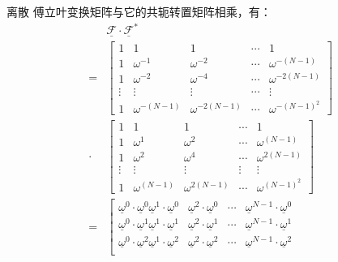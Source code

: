 离散 傅立叶变换矩阵与它的共轭转置矩阵相乘，有：
\begin{align*}
	      & \underline{\mathcal{F}}\cdot \underline{\mathcal{F}}^{*} \\
	=     &
	\left[
		\begin{matrix}
			1      & 1               & 1                & \cdots & 1                 \\
			1      & \omega^{-1}     & \omega^{-2}      & \cdots & \omega^{-(N-1)}   \\
			1      & \omega^{-2}     & \omega^{-4}      & \cdots & \omega^{-2(N-1)}  \\
			\vdots & \vdots          & \vdots           & \cdots & \vdots            \\
			1      & \omega^{-(N-1)} & \omega^{-2(N-1)} & \cdots & \omega^{-(N-1)^2}
		\end{matrix}
		\right]                                                          \\
	\cdot &
	\left[
		\begin{matrix}
			1      & 1              & 1               & \cdots & 1                \\
			1      & \omega^{1}     & \omega^{2}      & \cdots & \omega^{(N-1)}   \\
			1      & \omega^{2}     & \omega^{4}      & \cdots & \omega^{2(N-1)}  \\
			\vdots & \vdots         & \vdots          & \vdots & \vdots           \\
			1      & \omega^{(N-1)} & \omega^{2(N-1)} & \cdots & \omega^{(N-1)^2}
		\end{matrix}
		\right]                                                          \\
	=     & \left[
		\begin{matrix}\underline{\omega}^0\cdot\underline{\omega}^0
			\underline{\omega}^1\cdot\underline{\omega}^0                                                      & \underline{\omega}^2\cdot\underline{\omega}^0     & \cdots & \underline{\omega}^{N-1}\cdot\underline{\omega}^0     \\
			\underline{\omega}^0\cdot\underline{\omega}^1\underline{\omega}^1\cdot\underline{\omega}^1         & \underline{\omega}^2\cdot\underline{\omega}^1     & \cdots & \underline{\omega}^{N-1}\cdot\underline{\omega}^1     \\
			\underline{\omega}^0\cdot\underline{\omega}^2\underline{\omega}^1\cdot\underline{\omega}^2         & \underline{\omega}^2\cdot\underline{\omega}^2     & \cdots & \underline{\omega}^{N-1}\cdot\underline{\omega}^2     \\

\end{matrix}
\end{align*}
